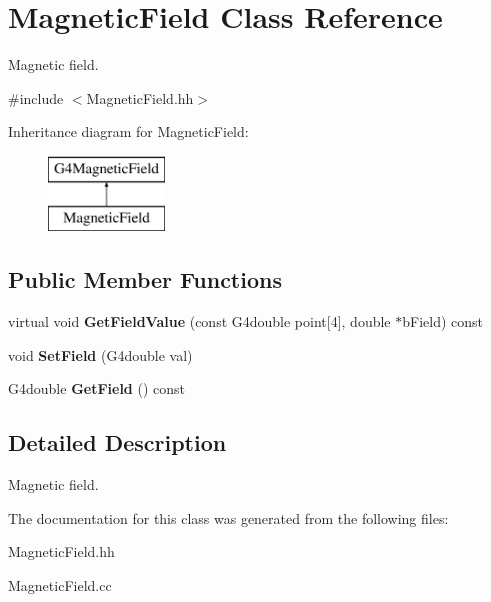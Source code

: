 \hypertarget{class_magnetic_field}{}\section{Magnetic\+Field Class Reference}
\label{class_magnetic_field}


Magnetic field.  




{\ttfamily \#include $<$Magnetic\+Field.\+hh$>$}

Inheritance diagram for Magnetic\+Field\+:\begin{figure}[H]
\begin{center}
\leavevmode
\includegraphics[height=2.000000cm]{class_magnetic_field}
\end{center}
\end{figure}
\subsection*{Public Member Functions}
\begin{DoxyCompactItemize}
\item 
\hypertarget{class_magnetic_field_abe1e09a803c7a4dd4ba309b2a812b18c}{}virtual void {\bfseries Get\+Field\+Value} (const G4double point\mbox{[}4\mbox{]}, double $\ast$b\+Field) const \label{class_magnetic_field_abe1e09a803c7a4dd4ba309b2a812b18c}

\item 
\hypertarget{class_magnetic_field_a252b22b09dff47a404b209568716288b}{}void {\bfseries Set\+Field} (G4double val)\label{class_magnetic_field_a252b22b09dff47a404b209568716288b}

\item 
\hypertarget{class_magnetic_field_a6254a001c9505fbdcc7c3270e9e58e78}{}G4double {\bfseries Get\+Field} () const \label{class_magnetic_field_a6254a001c9505fbdcc7c3270e9e58e78}

\end{DoxyCompactItemize}


\subsection{Detailed Description}
Magnetic field. 

The documentation for this class was generated from the following files\+:\begin{DoxyCompactItemize}
\item 
Magnetic\+Field.\+hh\item 
Magnetic\+Field.\+cc\end{DoxyCompactItemize}
